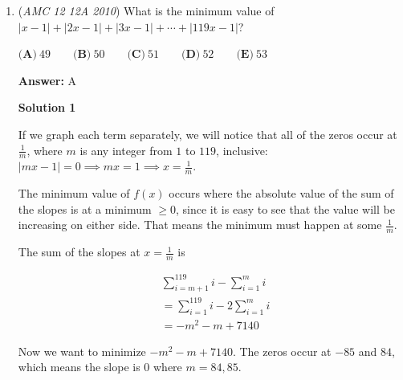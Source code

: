 \begin{enumerate}
The $x$ values in the coordinates of which these $2$ polynomials intersect is the same as the zeroes of
 \[P(x)=x^6-10x^5+29x^4-4x^3+ax^2-bx-c.\]Since there are only $3$ intersections, they must all be double roots. So, we let $r,s,$ and $t$ be the roots of $P(x)$. We let,
 \[(x-r)(x-s)(x-t)=x^3-ux^2+vx-w\]
 \[\Longrightarrow [(x-r)(x-s)(x-t)]^2=x^6-10x^5+29x^4-4x^3+ax^2-bx-c\]
 \[\Longrightarrow \sqrt{x^6-10x^5+29x^4-4x^3+ax^2-bx-c} = x^3-ux^2+vx-w\]
 \[\Longrightarrow x^6-10x^5+29x^4-4x^3+ax^2-bx-c=(x^3-ux^2+vx-w)^2\]
 \[\Longrightarrow x^6-10x^5+29x^4-4x^3+ax^2-bx-c=x^6-(2u)x^5+(u^2+2v)x^4-(2w+2uv)x^3+...\]We don't really care about the other coefficients because they aren't known. So, comparing coefficients, we get $(u,v,w)=(5,2,-8)$. So, we have
 \[(x-r)(x-s)(x-t)=x^3-5x^2+2x+8.\]Now, we can use RRT to finish from here. Factoring the polynomial gives
 \[x^3-5x^2+2x+8=(x+1)(x-2)(x-4),\]so, our largets root is $\boxed{\textbf{(A)}\ 4}.$

 -jb2015007

 


	\item (\textit{AMC 12 12A 2010}) What is the minimum value of $\left|x-1\right| + \left|2x-1\right| + \left|3x-1\right| + \cdots + \left|119x - 1 \right|$?


 $\textbf{(A)}\ 49 \qquad \textbf{(B)}\ 50 \qquad \textbf{(C)}\ 51 \qquad \textbf{(D)}\ 52 \qquad \textbf{(E)}\ 53$

 \textbf{Answer: }A



\textbf{Solution 1}

If we graph each term separately, we will notice that all of the zeros occur at $\frac{1}{m}$, where $m$ is any integer from $1$ to $119$, inclusive: $|mx-1|=0\implies mx=1\implies x=\frac{1}{m}$.

 The minimum value of $f(x)$ occurs where the absolute value of the sum of the slopes is at a minimum $\ge 0$, since it is easy to see that the value will be increasing on either side. That means the minimum must happen at some $\frac{1}{m}$.

 The sum of the slopes at $x = \frac{1}{m}$ is

 
 \begin{align*}&\sum_{i=m+1}^{119}i - \sum_{i=1}^{m}i\\ &=\sum_{i=1}^{119}i - 2\sum_{i=1}^{m}i\\ &=-m^2-m+7140\end{align*}


 Now we want to minimize $-m^2-m+7140$. The zeros occur at $-85$ and $84$, which means the slope is $0$ where $m = 84, 85$.


\end{enumerate}
